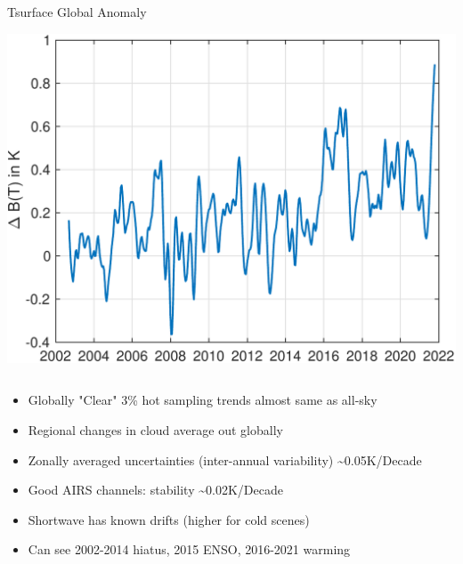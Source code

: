\documentclass[10pt,t]{beamer}
\begin{document}
\begin{frame}
\begin{columns}
\begin{column}{0.5\columnwidth}
\begin{block}{\footnotesize Tsurface Global Anomaly}
\vspace{-0.05in}
\begin{center}
\includegraphics[width=\linewidth]{SunClimate2022/global_bt1231_anomaly.pdf}
\end{center}
\end{block}
\end{column}
\end{columns}

\vspace{-0.1in}
\footnotesize
\begin{itemize}
\item Globally "Clear" 3\% hot sampling trends almost same as all-sky
\item Regional changes in cloud average out globally
\item Zonally averaged uncertainties (inter-annual variability) \textasciitilde{}0.05K/Decade
\item Good AIRS channels: stability \textasciitilde{}0.02K/Decade
\item Shortwave has known drifts (higher for cold scenes)
\item Can see 2002-2014 hiatus, 2015 ENSO, 2016-2021 warming
\end{itemize}
\end{frame}
\end{document}
